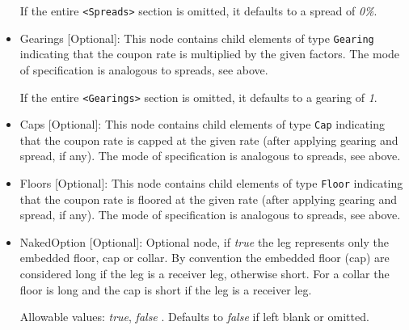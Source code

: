 \begin{itemize}
If the entire {\tt <Spreads>} section is omitted, it defaults to a spread of \emph{0\%}.

\item Gearings [Optional]: This node contains child elements of type \lstinline!Gearing! indicating that the coupon rate is
  multiplied by the given factors. The mode of specification is analogous to spreads, see above.
  
If the entire {\tt <Gearings>} section is omitted, it defaults to a gearing of \emph{1}.

\item Caps [Optional]: This node contains child elements of type \lstinline!Cap! indicating that the coupon rate is capped at the
  given rate (after applying gearing and spread, if any). The mode of specification is analogous to spreads, see above.

\item Floors [Optional]: This node contains child elements of type \lstinline!Floor! indicating that the coupon rate is floored at
  the given rate (after applying gearing and spread, if any). The mode of specification is analogous to spreads, see
  above.

\item NakedOption [Optional]: Optional node, if \emph{true} the leg represents only the embedded floor, cap or collar.
  By convention the embedded floor (cap) are considered long if the leg is a receiver leg, otherwise short. For a
  collar the floor is long and the cap is short if the leg is a receiver leg.

 Allowable values: \emph{true}, \emph{false} . Defaults to \emph{false} if left blank or omitted.

\end{itemize}
